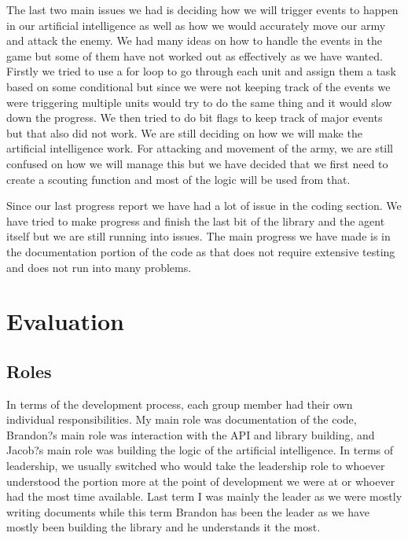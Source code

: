 \documentclass[10pt,letterpaper,onecolumn,draftclsnofoot]{IEEEtran}
\begin{document}
The last two main issues we had is deciding how we will trigger events to happen in our artificial intelligence as well as how we would accurately move our army and attack the enemy. We had many ideas on how to handle the events in the game but some of them have not worked out as effectively as we have wanted. Firstly we tried to use a for loop to go through each unit and assign them a task based on some conditional but since we were not keeping track of the events we were triggering multiple units would try to do the same thing and it would slow down the progress. We then tried to do bit flags to keep track of major events but that also did not work. We are still deciding on how we will make the artificial intelligence work. For attacking and movement of the army, we are still confused on how we will manage this but we have decided that we first need to create a scouting function and most of the logic will be used from that.

Since our last progress report we have had a lot of issue in the coding section. We have tried to make progress and finish the last bit of the library and the agent itself but we are still running into issues. The main progress we have made is in the documentation portion of the code as that does not require extensive testing and does not run into many problems.

\section{Evaluation}
\subsection{Roles}
In terms of the development process, each group member had their own individual responsibilities. My main role was documentation of the code, Brandon?s main role was interaction with the API and library building, and Jacob?s main role was building the logic of the artificial intelligence. In terms of leadership, we usually switched who would take the leadership role to whoever understood the portion more at the point of development we were at or whoever had the most time available. Last term I was mainly the leader as we were mostly writing documents while this term Brandon has been the leader as we have mostly been building the library and he understands it the most.
\end{document}
